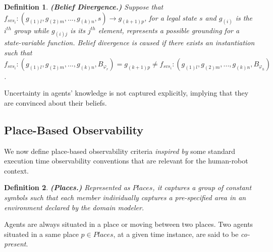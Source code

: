 \documentclass[letterpaper]{article} %
\newtheorem{definition}{Definition}
\begin{document}
\begin{definition}
\textbf{(Belief Divergence.)}
Suppose that $f_{\textit{svs}_i}:(g_{(1)l},g_{(2)m},...,g_{(k)n},s) \rightarrow g_{(k+1)p}$, for a legal state $s$ and $g_{(i)}$ is the $i^{th}$ group while $g_{(i)j}$ is its $j^{th}$ element, represents a possible {\em grounding} for a state-variable function.
Belief divergence is caused if there exists an instantiation such that $f_{\textit{svs}_i}:(g_{(1)l},g_{(2)m},...,g_{(k)n},B_{\varphi_r}) = {g_{(k+1)p}}  \neq f_{\textit{svs}_i}:(g_{(1)l},g_{(2)m},...,g_{(k)n},B_{\varphi_h})$.
\end{definition} 

Uncertainty in agents' knowledge is not captured explicitly, implying that they are convinced about their beliefs.

\subsection{Place-Based Observability}
We now define place-based observability criteria \textit{inspired by} some standard execution time observability conventions that are relevant for the human-robot context. 

\begin{definition}
\textbf{(Places.)} Represented as $\mathit{Places}$, 
it
captures a group of constant symbols such that each member individually captures a pre-specified area in an environment declared by the domain modeler.  
\end{definition}
Agents are always situated in a place or moving between two places. Two agents situated in a same place $p \in \mathit{Places}$, at a given time instance, are said to be \textit{co-present}.

\end{document}

